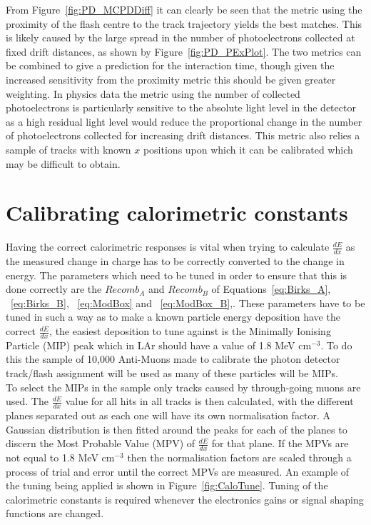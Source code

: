 From Figure~\ref{fig:PD_MCPDDiff} it can clearly be seen that the metric using the proximity of the flash centre to the track trajectory yields the best matches. This is likely caused by the large spread in the number of photoelectrons collected at fixed drift distances, as shown by Figure~\ref{fig:PD_PExPlot}. The two metrics can be combined to give a prediction for the interaction time, though given the increased sensitivity from the proximity metric this should be given greater weighting. In physics data the metric using the number of collected photoelectrons is particularly sensitive to the absolute light level in the detector as a high residual light level would reduce the proportional change in the number of photoelectrons collected for increasing drift distances. This metric also relies a sample of tracks with known $x$ positions upon which it can be calibrated which may be difficult to obtain. \\

\section{Calibrating calorimetric constants} \label{sec:MCCalib} %
Having the correct calorimetric responses is vital when trying to calculate $\frac{dE}{dx}$ as the measured change in charge has to be correctly converted to the change in energy. The parameters which need to be tuned in order to ensure that this is done correctly are the $Recomb_A$ and $Recomb_B$ of Equations~\ref{eq:Birks_A}, ~\ref{eq:Birks_B}, ~\ref{eq:ModBox} and ~\ref{eq:ModBox_B},. These parameters have to be tuned in such a way as to make a known particle energy deposition have the correct $\frac{dE}{dx}$, the easiest deposition to tune against is the Minimally Ionising Particle (MIP) peak which in LAr should have a value of 1.8 MeV cm$^{-3}$. To do this the sample of 10,000 Anti-Muons made to calibrate the photon detector track/flash assignment will be used as many of these particles will be MIPs. \\

To select the MIPs in the sample only tracks caused by through-going muons are used. The $\frac{dE}{dx}$ value for all hits in all tracks is then calculated, with the different planes separated out as each one will have its own normalisation factor. A Gaussian distribution is then fitted around the peaks for each of the planes to discern the Most Probable Value (MPV) of $\frac{dE}{dx}$ for that plane. If the MPVs are not equal to 1.8 MeV cm$^{-3}$ then the normalisation factors are scaled through a process of trial and error until the correct MPVs are measured. An example of the tuning being applied is shown in Figure~\ref{fig:CaloTune}. Tuning of the calorimetric constants is required whenever the electronics gains or signal shaping functions are changed.


